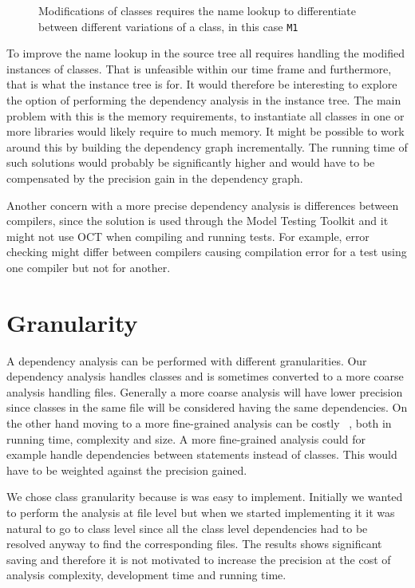 \documentclass{cslthse-msc}
\begin{document}
\begin{figure}[htbp]
    \centering
    \raisebox{4.0 cm}{}
    \caption{Modifications of classes requires the name lookup to differentiate between different variations of a class, in this case \texttt{M1}}
    \label{fig:betterLookup}
\end{figure}

To improve the name lookup in the source tree all requires handling the modified instances of classes. That is unfeasible within our time frame and furthermore, that is what the instance tree is for. It would therefore be interesting to explore the option of performing the dependency analysis in the instance tree. The main problem with this is the memory requirements, to instantiate all classes in one or more libraries would likely require to much memory. It might be possible to work around this by building the dependency graph incrementally. The running time of such solutions would probably be significantly higher and would have to be compensated by the precision gain in the dependency graph. 

Another concern with a more precise dependency analysis is differences between compilers, since the solution is used through the Model Testing Toolkit and it might not use OCT when compiling and running tests. For example, error checking might differ between compilers causing compilation error for a test using one compiler but not for another.



\section{Granularity}
A dependency analysis can be performed with different granularities. Our dependency analysis handles classes and is sometimes converted to a more coarse analysis handling files. Generally a more coarse analysis will have lower precision since classes in the same file will be considered having the same dependencies. On the other hand moving to a more fine-grained analysis can be costly ~\cite{DBLP:conf/sigsoft/LegunsenHSLZM16}, both in running time, complexity and size. A more fine-grained analysis could for example handle dependencies between statements instead of classes. This would have to be weighted against the precision gained.

We chose class granularity because is was easy to implement. Initially we wanted to perform the analysis at file level but when we started implementing it it was natural to go to class level since all the class level dependencies had to be resolved anyway to find the corresponding files. The results shows significant saving and therefore it is not motivated to increase the precision at the cost of analysis complexity, development time and running time.
\end{document}
